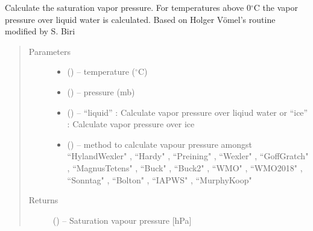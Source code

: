 \documentclass[letterpaper,10pt,english]{sphinxmanual}
\begin{document}
\begin{fulllineitems}
\label{\detokenize{index:hum_subs.VaporPressure}}
Calculate the saturation vapor pressure. For temperatures above 0$^{\circ}$C the vapor pressure over liquid water is calculated.
Based on Holger V\"{o}mel's routine modified by S. Biri
\begin{quote}\begin{description}
\item[{Parameters}] \leavevmode\begin{itemize}
\item {} 
 (\href{https://docs.python.org/3/library/functions.html\#float}{}) -- temperature ($^\circ$C)

\item {} 
 (\href{https://docs.python.org/3/library/functions.html\#float}{}) -- pressure (mb)

\item {} 
 (\href{https://docs.python.org/3/library/functions.html\#str}{}) -- ``liquid'' : Calculate vapor pressure over liqiud water or ``ice'' : Calculate vapor pressure over ice

\item {} 
 (\href{https://docs.python.org/3/library/functions.html\#str}{}) -- method to calculate vapour pressure amongst ``HylandWexler" \citep{Hyland_Wexler_1983}, ``Hardy" \citep{Hardy_1998}, ``Preining" \citep{Vehkamaeki_etal_2002}, ``Wexler" \citep{Wexler_1976}, ``GoffGratch" \citep{Goff_Gratch_1946}, ``MagnusTetens" \citep{Murray_1967}, ``Buck" \citep{Buck_1981}, ``Buck2" \citep{Buck_2012}, ``WMO" \citep{WMO_1988}, ``WMO2018" \citep{WMO_2018}, ``Sonntag" \citep{Sonntag_1994}, ``Bolton" \citep{Bolton_1980}, ``IAPWS" \citep{Wagner_Pruss_2002}, ``MurphyKoop" \citep{Murphy_Koop_2005}

\end{itemize}

\item[{Returns}] \leavevmode
{} (\href{https://docs.python.org/3/library/functions.html\#float}{}) -- Saturation vapour pressure [hPa]

\end{description}\end{quote}

\end{fulllineitems}
\end{document}
